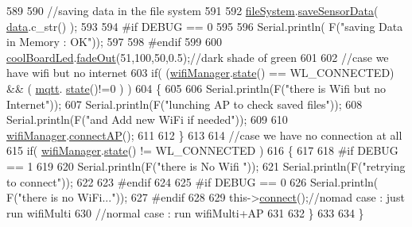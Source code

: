 \begin{DoxyCode}
589     
590     \textcolor{comment}{//saving data in the file system}
591     
592     \hyperlink{class_cool_board_a42c2586fbb13ff7f06538e9284e8538d}{fileSystem}.\hyperlink{class_cool_file_system_afa3a4feae94871d4d3b6bebb701c2e67}{saveSensorData}( \hyperlink{class_cool_board_a427fb753dd8575bdf821c70a5c63d695}{data}.c\_str() );
593 
594 \textcolor{preprocessor}{    #if DEBUG == 0}
595 
596         Serial.println( F(\textcolor{stringliteral}{"saving Data in Memory : OK"}));
597 
598 \textcolor{preprocessor}{    #endif}
599 
600     \hyperlink{class_cool_board_a1b1d3c684a5baa56b08486e192fd8e97}{coolBoardLed}.\hyperlink{class_cool_board_led_a93d545679237e8cc858324367149775c}{fadeOut}(51,100,50,0.5);\textcolor{comment}{//dark shade of green}
601 
602     \textcolor{comment}{//case we have wifi but no internet}
603     \textcolor{keywordflow}{if}( (\hyperlink{class_cool_board_acd88e6003606b47479ebba81e4aceeca}{wifiManager}.\hyperlink{class_cool_wifi_a1c7b4d82a4098d346e7593dce92039fa}{state}() == WL\_CONNECTED) && ( \hyperlink{class_cool_board_a2399f44d7c23c1149a335cb3b46d90f1}{mqtt}.
      \hyperlink{class_cool_m_q_t_t_a5d003307eff78efbd585e42b43b72b6d}{state}()!=0 ) )
604     \{
605         
606         Serial.println(F(\textcolor{stringliteral}{"there is Wifi but no Internet"}));
607         Serial.println(F(\textcolor{stringliteral}{"lunching AP to check saved files"}));
608         Serial.println(F(\textcolor{stringliteral}{"and Add new WiFi if needed"}));
609         
610         \hyperlink{class_cool_board_acd88e6003606b47479ebba81e4aceeca}{wifiManager}.\hyperlink{class_cool_wifi_a7c857f27161782f5ef1d62d552aff971}{connectAP}();
611         
612     \}
613     
614     \textcolor{comment}{//case we have no connection at all}
615     \textcolor{keywordflow}{if}( \hyperlink{class_cool_board_acd88e6003606b47479ebba81e4aceeca}{wifiManager}.\hyperlink{class_cool_wifi_a1c7b4d82a4098d346e7593dce92039fa}{state}() != WL\_CONNECTED )
616     \{
617     
618 \textcolor{preprocessor}{    #if DEBUG == 1}
619         
620         Serial.println(F(\textcolor{stringliteral}{"there is No Wifi "}));
621         Serial.println(F(\textcolor{stringliteral}{"retrying to connect"}));
622     
623 \textcolor{preprocessor}{    #endif}
624 
625 \textcolor{preprocessor}{    #if DEBUG == 0}
626         Serial.println( F(\textcolor{stringliteral}{"there is no WiFi..."}));
627 \textcolor{preprocessor}{    #endif}
628         
629         this->\hyperlink{class_cool_board_a519de78b807f8ec6463ff484eb925918}{connect}();\textcolor{comment}{//nomad case : just run wifiMulti}
630                 \textcolor{comment}{//normal case : run wifiMulti+AP}
631         
632     \}   
633 
634 \}
\end{DoxyCode}
